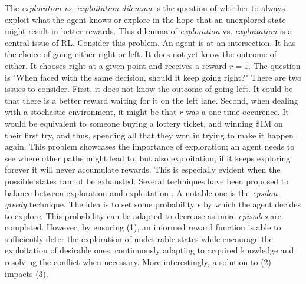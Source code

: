 \documentclass[a4paper,11pt]{article}
\theoremstyle{definition}
\begin{document}
The \emph{exploration vs. exploitation dilemma} is the question of whether to always exploit what the
agent knows or explore in the hope that an unexplored state might
result in better rewards. This dilemma of \emph{exploration} vs. \emph{exploitation} is a central issue of RL. Consider this problem. An agent is at an intersection. It has the choice of going either right or left. 
It does not yet know the outcome of either. It chooses right at a given point and receives a reward $r=1$. The question is "When faced with the same decision, should it keep going right?" There are two issues to consider. 
First, it does not know the outcome of going left. It could be that there is a better reward waiting for it on the left lane. Second, when dealing with a stochastic environment, it might be that $r$ was a one-time occurence. 
It would be equivalent to someone buying a lottery ticket, and winning
\$1M on their first try, and thus, spending all that they won in trying to make it happen again. This problem showcases the importance of exploration; an agent 
needs to see where other paths might lead to, but also exploitation; if it keeps exploring forever it will never accumulate rewards. This is especially evident when the possible states cannot be exhausted. Several techniques have been proposed 
to balance between exploration and exploitation \cite{Kaelbling1996ReinforcementLA}. A notable one is the \emph{epsilon-greedy} technique. The idea is to set some probability $\epsilon$ by which the agent decides to explore. This probability can be adapted 
to decrease as more \emph{episodes} are completed. However, by ensuring (1), an informed reward function is able to sufficiently 
deter the exploration of undesirable states while encourage the exploitation of desirable ones, continuously adapting to 
acquired knowledge and resolving the conflict when necessary. More interestingly, a solution to (2) impacts (3). 


\medskip
\end{document}
